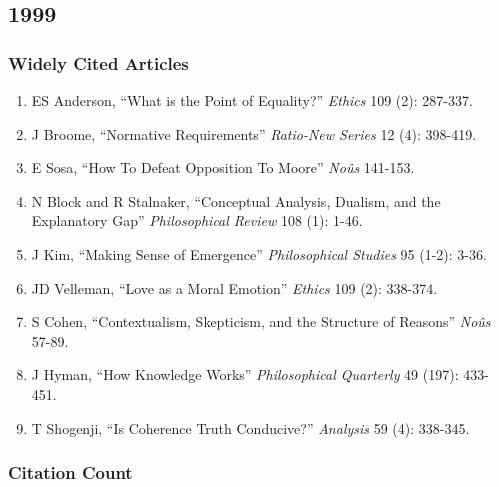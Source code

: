 \documentclass[
  10pt,
  letterpaper,
  DIV=11,
  numbers=noendperiod,
  twoside]{scrartcl}
\providecommand{\tightlist}{%
  \setlength{\itemsep}{0pt}\setlength{\parskip}{0pt}}\usepackage{longtable,booktabs,array}
\begin{document}
\newpage

\subsection{1999}\label{section-23}

\subsubsection*{Widely Cited Articles}\label{widely-cited-articles-23}

\begin{enumerate}
\def\labelenumi{\arabic{enumi}.}
\tightlist
\item
  ES Anderson, ``What is the Point of Equality?'' \emph{Ethics} 109 (2):
  287-337.
\item
  J Broome, ``Normative Requirements'' \emph{Ratio-New Series} 12 (4):
  398-419.
\item
  E Sosa, ``How To Defeat Opposition To Moore'' \emph{Noûs} 141-153.
\item
  N Block and R Stalnaker, ``Conceptual Analysis, Dualism, and the
  Explanatory Gap'' \emph{Philosophical Review} 108 (1): 1-46.
\item
  J Kim, ``Making Sense of Emergence'' \emph{Philosophical Studies} 95
  (1-2): 3-36.
\item
  JD Velleman, ``Love as a Moral Emotion'' \emph{Ethics} 109 (2):
  338-374.
\item
  S Cohen, ``Contextualism, Skepticism, and the Structure of Reasons''
  \emph{Noûs} 57-89.
\item
  J Hyman, ``How Knowledge Works'' \emph{Philosophical Quarterly} 49
  (197): 433-451.
\item
  T Shogenji, ``Is Coherence Truth Conducive?'' \emph{Analysis} 59 (4):
  338-345.
\end{enumerate}

\subsubsection*{Citation Count}\label{citation-count-23}
\end{document}
